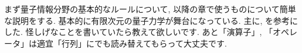 まず量子情報分野の基本的なルールについて, 以降の章で使うものについて簡単な説明をする. 
基本的に有限次元の量子力学が舞台になっている. 
主に\cite{nielsen2010quantum}, \cite{SagawaEntropy}を参考にした. 
怪しげなことを書いていたら教えて欲しいです. 
あと「演算子」, 「オペレータ」は適宜「行列」にでも読み替えてもらって大丈夫です. 